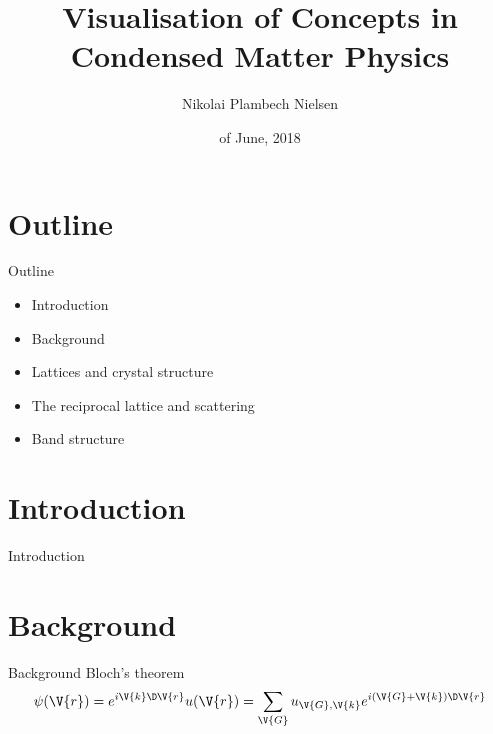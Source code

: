 \documentclass{beamer}
\title{Visualisation of Concepts in Condensed Matter Physics}
\author{Nikolai Plambech Nielsen}
\institute{Niels Bohr Institute}
\date{\nth{27} of June, 2018}
\begin{document}
\begin{frame}
  \titlepage
\end{frame}


\section{Outline}
\begin{frame}{Outline}
\begin{itemize}
  \item Introduction
  \item Background
  \item Lattices and crystal structure
  \item The reciprocal lattice and scattering
  \item Band structure
\end{itemize}
\end{frame}



\section{Introduction}
\begin{frame}{Introduction}
\end{frame}


\section{Background}
\begin{frame}{Background}
Bloch's theorem
\begin{equation*}
	\psi(\V{r}) = e^{i \V{k}\D \V{r}} u(\V{r}) = \sum_{\V{G}} u_{\V{G},\V{k}} e^{i (\V{G}+\V{k}) \D \V{r}}
\end{equation*}
\end{frame}
\end{document}
